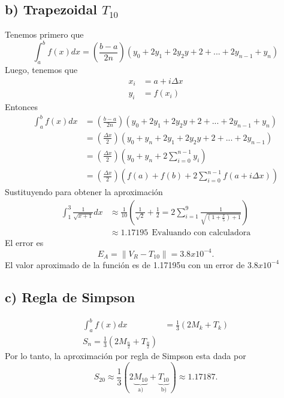 \documentclass[11pt,letterpaper]{article}
\begin{document}
\subsection*{b) Trapezoidal $T_{10}$}
Tenemos primero que
\begin{equation*}
  \int_a^b f(x)dx=\left( \frac{b-a}{2n}\right)\left( y_0+2y_1+2y_2y+2+...+2y_{n-1}+y_n\right)
\end{equation*}
Luego, tenemos que
\begin{equation*}
  \begin{split}
    x_i &= a+i\Delta x\\
    y_i &= f(x_i)
  \end{split}
\end{equation*}
Entonces
\begin{equation*}
  \begin{split}
    \int_a^b f(x)dx &= \left( \frac{b-a}{2n}\right)\left( y_0+2y_1+2y_2y+2+...+2y_{n-1}+y_n\right)\\
    &=\left( \frac{\Delta x}{2}\right)\left( y_0+y_n+2y_1+2y_2y+2+...+2y_{n-1}\right)\\
    &=\left( \frac{\Delta x}{2}\right)\left( y_0+y_n+2\sum_{i=0}^{n-1}y_i \right)\\
    &=\left( \frac{\Delta x}{2}\right)\left( f(a)+f(b)+2\sum_{i=0}^{n-1}f(a+i\Delta x) \right)
  \end{split}
\end{equation*}
Sustituyendo para obtener la aproximación
\begin{equation*}
  \begin{split}
    \int_1^3 \frac{1}{\sqrt{x+1}}dx &\approx \frac{1}{10}\left( \frac{1}{\sqrt{2}}+\frac{1}{2}=2\sum_{i=1}^{9}\frac{1}{\sqrt{(1+\frac{x}{5})+1}} \right)\\
    &\approx 1.17195 \ \ \text{Evaluando con calculadora}
  \end{split}
\end{equation*}
El error es
\begin{equation*}
    E_A=\|V_R-T_{10} \|=3.8x10^{-4}.
\end{equation*}
El valor aproximado de la función es de 1.17195u con un error de $3.8x10^{-4}$

\subsection*{c) Regla de Simpson}
\begin{equation*}
  \begin{split}
    \int_a^b f(x)dx &= \frac{1}{3}\left( 2M_k+T_k \right)\\
    S_n = \frac{1}{3}\left( 2M_{\frac{n}{2}}+T_{\frac{n}{2}}  \right)
    \end{split}
\end{equation*}
Por lo tanto, la aproximación por regla de Simpson esta dada por
\begin{equation*}
  S_{20}\approx\frac{1}{3}\left( 2\underbrace{M_{10}}_{\text{a)}}+\underbrace{T_{10}}_{\text{b)}}\right)\approx 1.17187.
\end{equation*}
\end{document}
